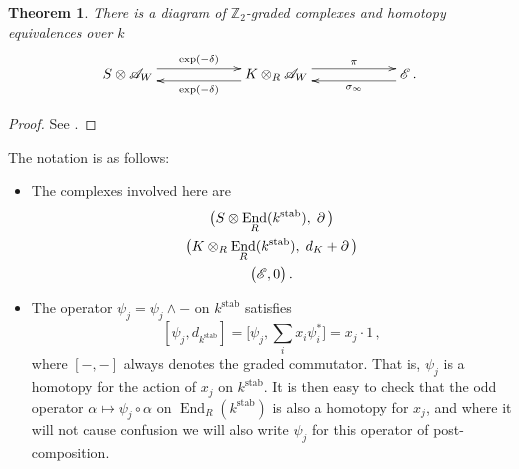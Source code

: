 \documentclass[english,letter paper,12pt,leqno]{article}
\newtheorem{theorem}{Theorem}[section]
\theoremstyle{example}
\numberwithin{equation}{section}
\def\stab{\operatorname{stab}}
\def\be{\begin{equation}}
\def\ee{\end{equation}}
\def\nZ{\mathds{Z}}
\DeclareMathOperator{\End}{End}
\begin{document}
\begin{theorem} There is a diagram of $\nZ_2$-graded complexes and homotopy equivalences over $k$
\be\label{eq:first_he}
\xymatrix@C+3pc{
S \otimes \md{A}_W \ar@<1ex>[r]^-{\exp(-\delta)} & K \otimes_R \md{A}_W \ar@<1ex>[l]^-{ \exp(-\delta) } \ar@<1ex>[r]^-{\pi} & \md{E}\,.\ar@<1ex>[l]^-{ \sigma_\infty }
}
\ee
\end{theorem}
\begin{proof}
See \cite{murfet}.
\end{proof}

The notation is as follows:
\begin{itemize}
\item The complexes involved here are
\begin{gather*}
\big( S \otimes \End_R(k^{\stab}), \; \partial \,\big)\\
\big( K \otimes_R \End_R(k^{\stab}), \; d_K + \partial\, \big)\\
\big( \md{E}, 0 \big)\,.
\end{gather*}
\item The operator $\psi_j = \psi_j \wedge -$ on $k^{\stab}$ satisfies
\[
[ \psi_j, d_{k^{\stab}} ] = \big[ \psi_j, \sum_i x_i \psi_i^* \big] = x_j \cdot 1\,,
\]
where $[-,-]$ always denotes the graded commutator. That is, $\psi_j$ is a homotopy for the action of $x_j$ on $k^{\stab}$. It is then easy to check that the odd operator $\alpha \mapsto \psi_j \circ \alpha$ on $\End_R(k^{\stab})$ is also a homotopy for $x_j$, and where it will not cause confusion we will also write $\psi_j$ for this operator of post-composition.


\end{itemize}
\end{document}
